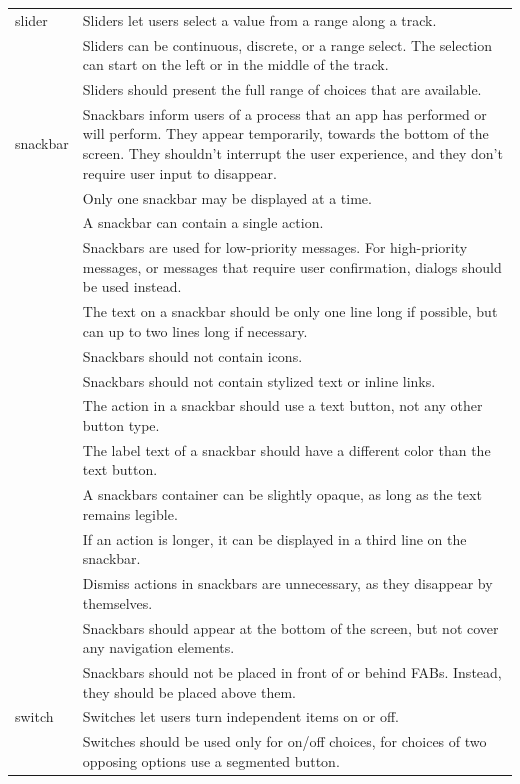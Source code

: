 \documentclass[11pt,titlepage,oneside,openany]{book}
\begin{document}
\begin{longtable}{|p{}|p{}|}
	slider & Sliders let users select a value from a range along a track. \\ 
	~ & Sliders can be continuous, discrete, or a range select. The selection can start on the left or in the middle of the track. \\ 
	~ & Sliders should present the full range of choices that are available. \\ \hline
	snackbar & Snackbars inform users of a process that an app has performed or will perform. They appear temporarily, towards the bottom of the screen. They shouldn't interrupt the user experience, and they don't require user input to disappear. \\ 
	~ & Only one snackbar may be displayed at a time. \\ 
	~ & A snackbar can contain a single action. \\ 
	~ & Snackbars are used for low-priority messages. For high-priority messages, or messages that require user confirmation, dialogs should be used instead. \\ 
	~ & The text on a snackbar should be only one line long if possible, but can up to two lines long if necessary. \\ 
	~ & Snackbars should not contain icons. \\ 
	~ & Snackbars should not contain stylized text or inline links. \\ 
	~ & The action in a snackbar should use a text button, not any other button type. \\ 
	~ & The label text of a snackbar should have a different color than the text button. \\ 
	~ & A snackbars container can be slightly opaque, as long as the text remains legible. \\ 
	~ & If an action is longer, it can be displayed in a third line on the snackbar. \\ 
	~ & Dismiss actions in snackbars are unnecessary, as they disappear by themselves. \\ 
	~ & Snackbars should appear at the bottom of the screen, but not cover any navigation elements. \\ 
	~ & Snackbars should not be placed in front of or behind FABs. Instead, they should be placed above them. \\ \hline
	switch & Switches let users turn independent items on or off. \\ 
	~ & Switches should be used only for on/off choices, for choices of two opposing options use a segmented button. \\ 

\end{longtable}
\end{document}
